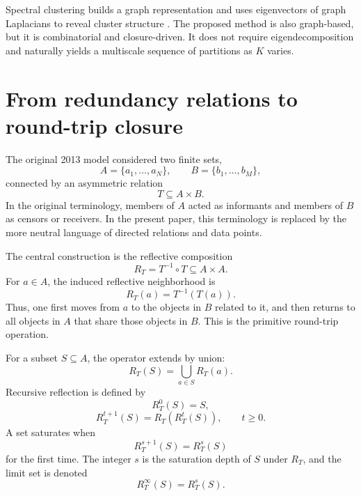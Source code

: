 \documentclass[11pt,a4paper]{article}
\begin{document}
Spectral clustering builds a graph representation and uses eigenvectors of graph Laplacians to reveal cluster structure \citep{NgJordanWeiss2002,VonLuxburg2007}. The proposed method is also graph-based, but it is combinatorial and closure-driven. It does not require eigendecomposition and naturally yields a multiscale sequence of partitions as $K$ varies.

\section{From redundancy relations to round-trip closure}
\label{sec:relational}

The original 2013 model considered two finite sets,
\begin{equation}
A=\{a_1,\ldots,a_N\},\qquad B=\{b_1,\ldots,b_M\},
\end{equation}
connected by an asymmetric relation
\begin{equation}
T\subseteq A\times B.
\end{equation}
In the original terminology, members of $A$ acted as informants and members of $B$ as censors or receivers. In the present paper, this terminology is replaced by the more neutral language of directed relations and data points.

The central construction is the reflective composition
\begin{equation}
R_T = T^{-1}\circ T \subseteq A\times A.
\end{equation}
For $a\in A$, the induced reflective neighborhood is
\begin{equation}
R_T(a)=T^{-1}(T(a)).
\label{eq:basic_reflection}
\end{equation}
Thus, one first moves from $a$ to the objects in $B$ related to it, and then returns to all objects in $A$ that share those objects in $B$. This is the primitive round-trip operation.

For a subset $S\subseteq A$, the operator extends by union:
\begin{equation}
R_T(S)=\bigcup_{a\in S}R_T(a).
\end{equation}
Recursive reflection is defined by
\begin{equation}
R_T^0(S)=S,
\end{equation}
\begin{equation}
R_T^{t+1}(S)=R_T(R_T^t(S)),\qquad t\geq 0.
\label{eq:rt_iteration_general}
\end{equation}
A set saturates when
\begin{equation}
R_T^{s+1}(S)=R_T^s(S)
\end{equation}
for the first time. The integer $s$ is the saturation depth of $S$ under $R_T$, and the limit set is denoted
\begin{equation}
R_T^\infty(S)=R_T^s(S).
\end{equation}
\end{document}
